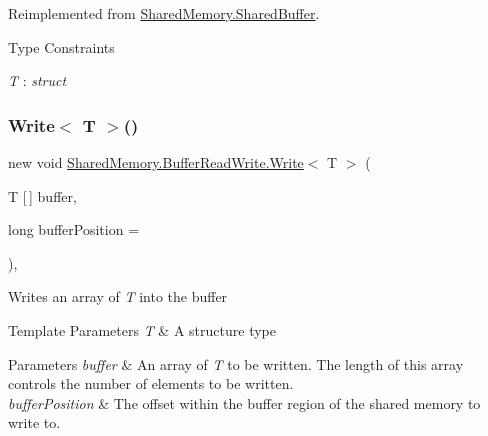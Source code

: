 Reimplemented from \hyperlink{class_shared_memory_1_1_shared_buffer_a82edbe6f30b012bc93f098db46a582ec}{Shared\+Memory.\+Shared\+Buffer}.

\begin{Desc}
\item[Type Constraints]\begin{description}
\item[{\em T} : {\em struct}]\end{description}
\end{Desc}
\mbox{\label{class_shared_memory_1_1_buffer_read_write_a12cdb995bc498bef477b8f91355eef3f}} 
\subsubsection{\texorpdfstring{Write$<$ T $>$()}{Write< T >()}\hspace{0.1cm}{\footnotesize\ttfamily [2/2]}}
{\footnotesize\ttfamily new void \hyperlink{class_shared_memory_1_1_buffer_read_write_afc484df280665f9d63ae28a21e46988d}{Shared\+Memory.\+Buffer\+Read\+Write.\+Write}$<$ T $>$ (\begin{DoxyParamCaption}\item[{T \mbox{[}$\,$\mbox{]}}]{buffer,  }\item[{long}]{buffer\+Position = {} }\end{DoxyParamCaption})\hspace{0.3cm}{\ttfamily [inline]}, {\ttfamily [virtual]}}



Writes an array of {\itshape T}  into the buffer 


\begin{DoxyTemplParams}{Template Parameters}
{\em T} & A structure type\\
\hline
\end{DoxyTemplParams}

\begin{DoxyParams}{Parameters}
{\em buffer} & An array of {\itshape T}  to be written. The length of this array controls the number of elements to be written.\\
\hline
{\em buffer\+Position} & The offset within the buffer region of the shared memory to write to.\\
\hline
\end{DoxyParams}


